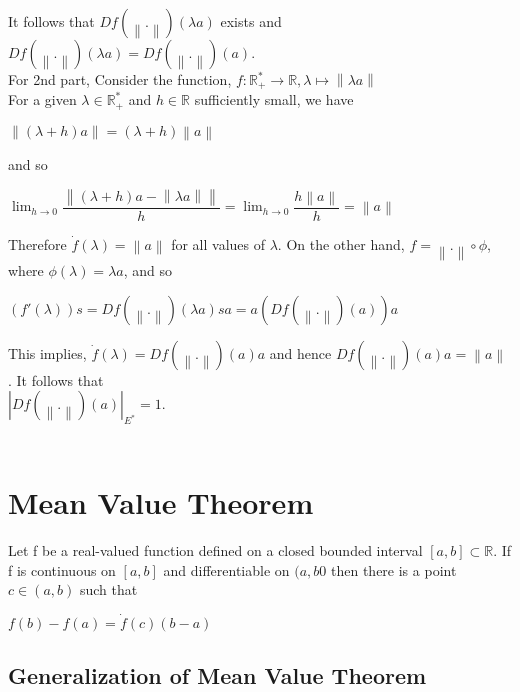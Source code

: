 \documentclass[11 pt]{article}
\theoremstyle{definition}
\theoremstyle{remark}
\newcommand{\R}{\mathbb{R}}
\newcommand\norm[1]{\left\lVert#1\right\rVert}
\begin{document}
It follows that $Df(\norm{.})(\lambda a)$ exists and $Df(\norm{.})(\lambda a) = Df(\norm{.})(a)$.\\

For 2nd part, Consider the function, $ f: \R_+^* \rightarrow \R, \lambda \mapsto \norm{\lambda a}$\\

For a given $\lambda \in \R_+^*$ and $h \in \R$ sufficiently small, we have\\
\begin{center}
$ \norm{(\lambda + h)a } = (\lambda + h)\norm{a} $
\end{center}

and so
\begin{center}
$ \lim_{h \to 0} \dfrac{\norm{(\lambda + h)a - \norm{\lambda a}}}{h} = \lim_{h \to 0} \dfrac{h \norm{a}}{h} = \norm{a} $
\end{center}

Therefore $ \dot{f}(\lambda) = \norm{a} $ for all values of $\lambda$. On the other hand, $f = \norm{.} \circ \phi$, where $ \phi(\lambda) = \lambda a$, and so \\
\begin{center}
$ (f'(\lambda))s = Df(\norm{.})(\lambda a) sa = a (Df(\norm{.})(a))a$
\end{center}

This implies, $ \dot{f}(\lambda) = Df(\norm{.})(a)a $ and hence $ Df(\norm{.})(a) a = \norm{a}$ . It follows that\\ $ |Df(\norm{.})(a)|_{E^*} = 1 $.\\~\\


\section{Mean Value Theorem}

\theorem Let f be a real-valued function defined on a closed bounded interval $[a,b] \subset \R$. If f is continuous on $[a,b] $ and differentiable on $(a,b0 $ then there is a point $c \in (a,b)$ such that
\begin{center}
$ f(b) - f(a) = \dot{f}(c)(b-a)$
\end{center}

\subsection{Generalization of Mean Value Theorem}
\end{document}
